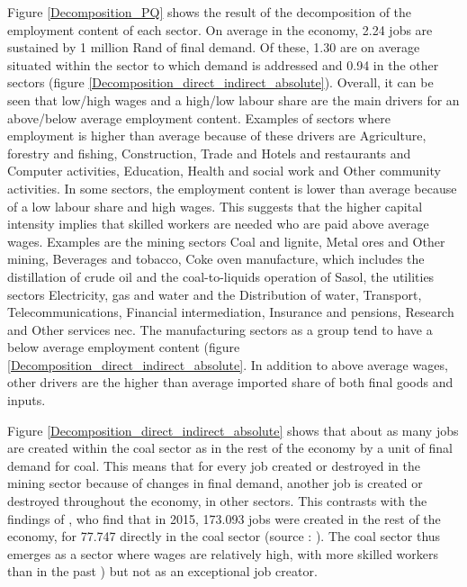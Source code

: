 \documentclass[12pt,english]{article}
\begin{document}
Figure \ref{Decomposition_PQ} shows the result of the decomposition of the employment content of each sector. %
On average in the economy, 2.24 jobs are sustained by 1 million Rand of final demand. Of these, 1.30 are on average situated within the sector to which demand is addressed and 0.94 in the other sectors (figure \ref{Decomposition_direct_indirect_absolute}). Overall, it can be seen that low/high wages and a high/low labour share are the main drivers for an above/below average employment content. Examples of sectors where employment is higher than average because of these drivers are Agriculture, forestry and fishing, Construction, Trade and Hotels and restaurants and Computer activities, Education, Health and social work and Other community activities. In some sectors, the employment content is lower than average because of a low labour share and high wages. This suggests that the higher capital intensity implies that skilled workers are needed who are paid above average wages. Examples are the mining sectors Coal and lignite, Metal ores and Other mining, Beverages and tobacco, Coke oven manufacture, which includes the distillation of crude oil and the coal-to-liquids operation of Sasol, the utilities sectors Electricity, gas and water and the Distribution of water, Transport, Telecommunications, Financial intermediation, Insurance and pensions, Research and Other services nec. The manufacturing sectors as a group tend to have a below average employment content (figure \ref{Decomposition_direct_indirect_absolute}. In addition to above average wages, other drivers are the higher than average imported share of both final goods and inputs. 

Figure \ref{Decomposition_direct_indirect_absolute} shows that about as many jobs are created within the coal sector as in the rest of the economy by a unit of final demand for coal. This means that for every job created or destroyed in the mining sector because of changes in final demand, another job is created or destroyed throughout the economy, in other sectors. This contrasts with the findings of \cite{ChamberofMines2018Strategy}, who find that in 2015, 173.093 jobs were created in the rest of the economy, for 77.747 directly in the coal sector (source : \cite{MineralsCouncil2018Facts}). The coal sector thus emerges as a sector where wages are relatively high, with more skilled workers than in the past \citep{burton2018coal}) but not as an exceptional job creator.


\end{document}
